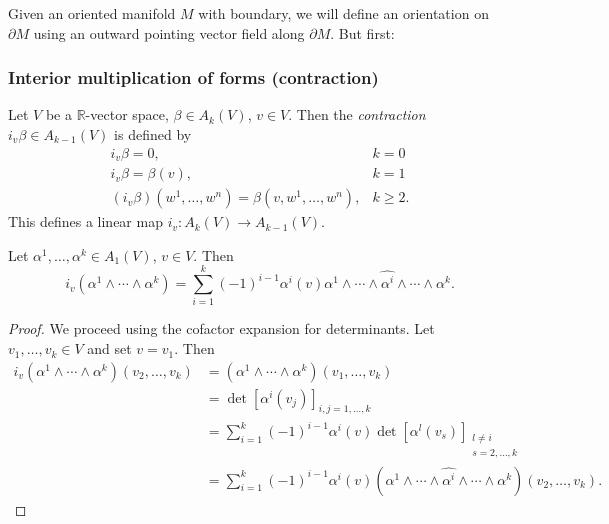 Given an oriented manifold $M$ with boundary, we will define an
orientation on $\partial M$ using an outward pointing vector field
along $\partial M$. But first:

\subsubsection{Interior multiplication of forms (contraction)}
\begin{defn}
Let $V$ be a $\mathbb{R}$-vector space, $\beta \in A_k(V)$,
$v \in V$. Then the \emph{contraction}
$i_v \beta \in A_{k - 1}(V)$ is defined by
\begin{align*}
  i_v \beta = 0,        & k = 0 \\
  i_v \beta = \beta(v), & k = 1 \\
  (i_v \beta)(w^1, \dots, w^n)
= \beta(v, w^1, \dots, w^n), & k \geq 2.
\end{align*}
This defines a linear map $i_v : A_k(V) \to A_{k-1}(V)$.
\end{defn}

\begin{lemma}
Let $\alpha^1, \dots, \alpha^k \in A_1(V)$, $v \in V$. Then
$$
  i_v(\alpha^1 \wedge \cdots \wedge \alpha^k)
= \sum_{i=1}^k
    (-1)^{i-1} \alpha^i(v)
    \alpha^1 \wedge
    \cdots \wedge
    \hat{\alpha^i} \wedge
    \cdots \wedge
    \alpha^k.
$$
\end{lemma}
\begin{proof}
We proceed using the cofactor expansion for determinants.
Let $v_1, \dots, v_k \in V$ and set $v = v_1$. Then
\begin{align*}
   i_v(\alpha^1 \wedge \cdots \wedge \alpha^k)
     (v_2, \dots, v_k)
&= (\alpha^1 \wedge \cdots \wedge \alpha^k)
     (v_1, \dots, v_k) \\
&= \det[\alpha^i(v_j)]_{i,j=1,\dots,k} \\
&= \sum_{i=1}^k
     (-1)^{i-1}
     \alpha^i(v)
     \det[\alpha^l(v_s)]_{\substack{l \neq i \\ s=2,\dots,k}} \\
&= \sum_{i=1}^k
     (-1)^{i-1}
     \alpha^i(v)
     (\alpha^1 \wedge
      \cdots \wedge
      \hat{\alpha^i} \wedge
      \cdots \wedge
      \alpha^k)
      (v_2, \dots, v_k).
\end{align*}
\end{proof}

